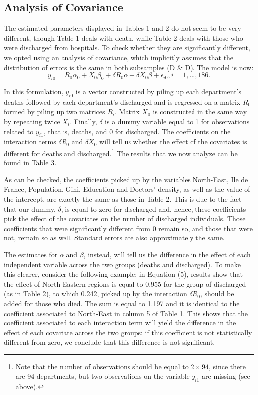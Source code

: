 \documentclass[a4paper]{article}
\theoremstyle{plain}
\theoremstyle{definition}
\begin{document}
\subsection{Analysis of Covariance}
The estimated parameters displayed in Tables 1 and 2 do not seem to be very different, though Table 1 deals with death, while Table 2 deals with those who were discharged from hospitals. To check whether they are significantly different, we opted using an analysis of covariance, which implicitly assumes that the distribution of errors is the same in both subsamples (D \& D). The model is now:
$$y_{i0}= R_0 \alpha_0 + X_0\beta_0  +  \delta R_0\alpha +  \delta X_0\beta + \epsilon_{i0}, i =1,..., 186.$$

\noindent In this formulation,  $y_{i0}$ is a vector constructed by piling up each department's deaths followed by each department's discharged and is regressed on a matrix $R_0$ formed by piling up two matrices $R_i$. Matrix $X_0$ is constructed in the same way by repeating twice $X_i$. Finally, $\delta$ is a dummy variable equal to 1 for observations related to $y_{i1}$, that is, deaths, and 0 for discharged. The coefficients on the interaction terms $\delta R_{0}$ and $\delta X_{0}$ will tell us whether the effect of the covariates is different for deaths and discharged.\footnote{Note that the number of observations should be equal to $2\times 94$, since there are 94 departments, but two observations on the variable $y_{i1}$ are missing (see above).} The results that we now analyze can be found in Table 3.

As can be checked, the coefficients picked up by the variables North-East, Ile de France, Population, Gini,  Education and Doctors' density, as well as the value of the intercept, are exactly the same as those in Table 2. This is due to the fact that our dummy, $\delta$, is equal to zero for discharged and, hence, these coefficients pick the effect of the covariates on the number of discharged individuals. Those coefficients that were significantly different from 0 remain so, and those that were not, remain so as well. Standard errors are also approximately the same. 

The estimates for $\alpha$ and $\beta$, instead, will tell us the difference in the effect of each independent variable across the two groups (deaths and discharged). To make this clearer, consider the following example: in Equation (5), results show that the effect of North-Eastern regions is equal to 0.955 for the group of discharged (as in Table 2), to which 0.242, picked up by the interaction $\delta R_0$, should be added for those who died. The sum is equal to 1.197 and it is identical to the coefficient associated to North-East in column 5 of Table 1. This shows that the coefficient associated to each interaction term will yield the difference in the effect of each covariate across the two groups: if this coefficient is not statistically different from zero, we conclude that this difference is not significant.
\end{document}
